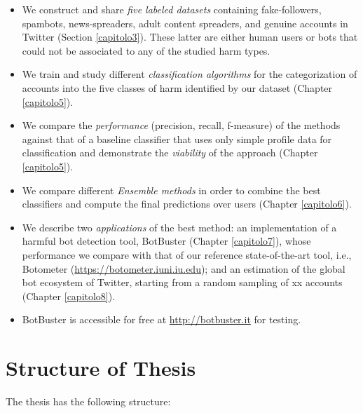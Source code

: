 \begin{itemize}
	\item[\PencilRight] We construct and share \emph{five labeled datasets} containing fake-followers, spambots, news-spreaders, adult content spreaders, and genuine accounts in Twitter (Section \ref{capitolo3}). These latter are either human users or bots that could not be associated to any of the studied harm types.
	
	\item[\PencilRight] We train and study different \emph{classification algorithms}	for the categorization of accounts into the five classes of harm identified by our dataset (Chapter \ref{capitolo5}).
	
	\item[\PencilRight] We compare the \emph{performance} (precision, recall, f-measure) of the methods against that of a baseline classifier that uses only simple profile data for classification and demonstrate the \emph{viability} of the approach (Chapter \ref{capitolo5}).
	
	\item[\PencilRight] We compare different \emph{Ensemble methods} in order to combine the best classifiers and compute  the final predictions over users (Chapter \ref{capitolo6}).
	
	\item[\PencilRight] We describe two \emph{applications} of the best method: an implementation of a harmful bot detection tool, BotBuster (Chapter \ref{capitolo7}), whose performance we compare with that of our reference state-of-the-art tool, i.e., Botometer (\url{https://botometer.iuni.iu.edu}); and an estimation of the global bot ecosystem of Twitter, starting from a random sampling of xx accounts (Chapter \ref{capitolo8}).
	
	\item[\PencilRight] BotBuster is accessible for free at \url{http://botbuster.it} for testing.
\end{itemize}


\section{Structure of Thesis}

The thesis has the following structure:

